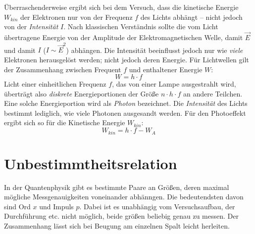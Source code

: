 Überraschenderweise ergibt sich bei dem Versuch, dass die kinetische Energie $W_{kin}$ der Elektronen nur von der Frequenz $f$ des Lichts abhängt -- nicht jedoch von der \emph{Intensität} $I$. Nach klassischen Verständnis sollte die vom Licht übertragene Energie von der Amplitude der Elektromagnetischen Welle, damit $\vec{E}$ und damit $I$ ($I \sim \vec{E}^2$) abhängen. Die Intensität beeinflusst jedoch nur wie \emph{viele} Elektronen herausgelöst werden; nicht jedoch deren Energie. Für Lichtwellen gilt der Zusammenhang zwischen Frequent $f$ und enthaltener Energie $W$:
\begin{equation}
   W = h \cdot f
   \label{eq_W=hf}
\end{equation}
Licht einer einheitlichen Frequenz $f$, das von einer Lampe ausgestrahlt wird, überträgt also \emph{diskrete} Energieportionen der Größe $n \cdot h \cdot f$ an andere Teilchen. Eine solche Energieportion wird als \emph{Photon} bezeichnet. Die \emph{Intensität} des Lichts bestimmt lediglich, wie viele Photonen ausgesandt werden.
Für den Photoeffekt ergibt sich so für die Kinetische Energie $W_{kin}$:
\begin{equation}
   W_{kin} = h \cdot f - W_A
\end{equation}




% 




		\section{Unbestimmtheitsrelation}


In der Quantenphysik gibt es bestimmte Paare an Größen, deren maximal mögliche Messgenauigkeiten voneinander abhänngen. Die bedeutendsten davon sind Ord $x$ und Impuls $p$. Dabei ist es unabhängig vom Versuchsaufbau, der Durchführung etc. nicht möglich, beide größen beliebig genau zu messen. Der Zusammenhang lässt sich bei Beugung am einzelnen Spalt leicht herleiten. 

